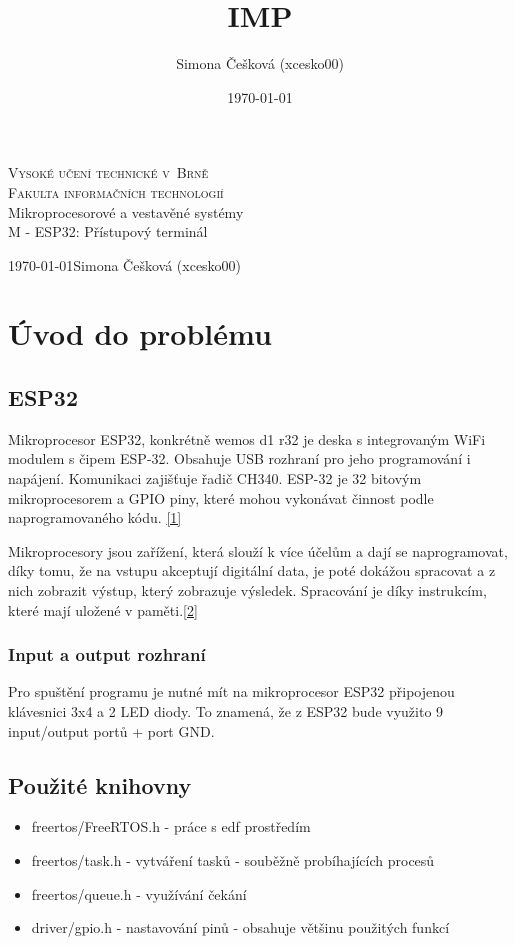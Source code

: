 \documentclass[a4paper, 11pt]{article}
\title{IMP}
\author{Simona Češková (xcesko00)}
\date{\today}
\begin{document}
\begin{titlepage}
\begin{center}
\Huge
\textsc{Vysoké učení technické v~Brně\\
\huge{Fakulta informačních technologií}} \\
\LARGE
Mikroprocesorové a vestavěné systémy \\
\Huge{M - ESP32: Přístupový terminál} \\
\end{center}
{\Large \today \hfill Simona Češková (xcesko00)}\\
\end{titlepage}
\tableofcontents
\newpage

\section{Úvod do problému}
\subsection{ESP32}
Mikroprocesor ESP32, konkrétně wemos d1 r32 je deska s integrovaným WiFi modulem s čipem ESP-32. Obsahuje USB rozhraní pro jeho programování i napájení. Komunikaci zajišťuje řadič CH340. ESP-32 je 32 bitovým mikroprocesorem a GPIO piny, které mohou vykonávat činnost podle naprogramovaného kódu. \href{https://www.laskakit.cz/wemos-d1-r32-uno-esp32/}{[1]}

Mikroprocesory jsou zařížení, která slouží k více účelům a dají se naprogramovat, díky tomu, že na vstupu akceptují digitální data, je poté dokážou spracovat a z nich zobrazit výstup, který zobrazuje výsledek. Spracování je díky instrukcím, které mají uložené v paměti.\href{https://www.giga-pc.cz/slovnik-pojmu/procesor/}{[2]}

\subsubsection{Input a output rozhraní}
Pro spuštění programu je nutné mít na mikroprocesor ESP32 připojenou klávesnici 3x4 a 2 LED diody. To znamená, že z ESP32 bude využito 9 input/output portů + port GND. 

\subsection{Použité knihovny}
\begin{itemize}
    \item freertos/FreeRTOS.h - práce s edf prostředím
    \item freertos/task.h - vytváření tasků - souběžně probíhajících procesů
    \item freertos/queue.h - využívání čekání
    \item driver/gpio.h - nastavování pinů - obsahuje většinu použitých funkcí
\end{itemize}
\end{document}
